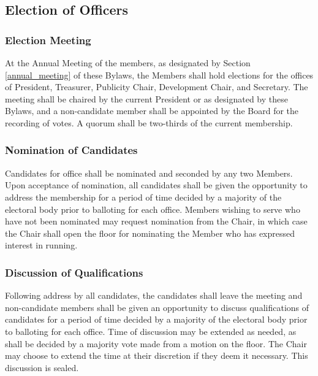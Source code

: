 \documentclass{article}
\begin{document}
\subsection{Election of Officers} \label{elections}

\subsubsection{Election Meeting}

At the Annual Meeting of the members, as designated by Section
\ref{annual_meeting} of these Bylaws, the Members shall hold elections for the
offices of President, Treasurer, Publicity Chair, Development Chair, and
Secretary. The meeting shall be chaired by the current President or as
designated by these Bylaws, and a non-candidate member shall be appointed by the
Board for the recording of votes. A quorum shall be two-thirds of the
current membership.

\subsubsection{Nomination of Candidates}

Candidates for office shall be nominated and seconded by any two Members.
Upon acceptance of nomination, all candidates shall be given the opportunity
to address the membership for a period of time decided by a majority
of the electoral body prior to balloting for each office. Members
wishing to serve who have not been nominated may request nomination
from the Chair, in which case the Chair shall open the floor for nominating
the Member who has expressed interest in running.

\subsubsection{Discussion of Qualifications}

Following address by all candidates, the candidates shall leave the meeting and
non-candidate members shall be given an opportunity to discuss qualifications of
candidates for a period of time decided by a majority of the electoral body
prior to balloting for each office. Time of discussion may be extended as
needed, as shall be decided by a majority vote made from a motion on the
floor. The Chair may choose to extend the time at their discretion if they deem it
necessary. This discussion is sealed.
\end{document}
